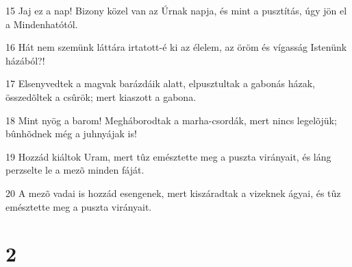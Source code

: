 \par 15 Jaj ez a nap! Bizony közel van az Úrnak napja, és mint a pusztítás, úgy jön el a Mindenhatótól.
\par 16 Hát nem szemünk láttára irtatott-é ki az élelem, az öröm és vígasság Istenünk házából?!
\par 17 Elsenyvedtek a magvak barázdáik alatt, elpusztultak a gabonás házak, összedõltek a csûrök; mert kiaszott a gabona.
\par 18 Mint nyög a barom! Megháborodtak a marha-csordák, mert nincs legelõjük; bûnhõdnek még a juhnyájak is!
\par 19 Hozzád kiáltok Uram, mert tûz emésztette meg a puszta virányait, és láng perzselte le a mezõ minden fáját.
\par 20 A mezõ vadai is hozzád esengenek, mert kiszáradtak a vizeknek ágyai, és tûz emésztette meg a puszta virányait.

\chapter{2}

